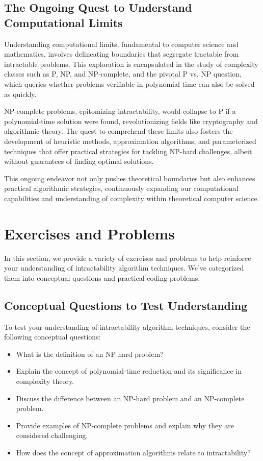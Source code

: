 \subsection{The Ongoing Quest to Understand Computational Limits}

Understanding computational limits, fundamental to computer science and mathematics, involves delineating boundaries that segregate tractable from intractable problems. This exploration is encapsulated in the study of complexity classes such as P, NP, and NP-complete, and the pivotal P vs. NP question, which queries whether problems verifiable in polynomial time can also be solved as quickly.

NP-complete problems, epitomizing intractability, would collapse to P if a polynomial-time solution were found, revolutionizing fields like cryptography and algorithmic theory. The quest to comprehend these limits also fosters the development of heuristic methods, approximation algorithms, and parameterized techniques that offer practical strategies for tackling NP-hard challenges, albeit without guarantees of finding optimal solutions.

This ongoing endeavor not only pushes theoretical boundaries but also enhances practical algorithmic strategies, continuously expanding our computational capabilities and understanding of complexity within theoretical computer science.



\section{Exercises and Problems}

In this section, we provide a variety of exercises and problems to help reinforce your understanding of intractability algorithm techniques. We've categorized them into conceptual questions and practical coding problems.

\subsection{Conceptual Questions to Test Understanding}

To test your understanding of intractability algorithm techniques, consider the following conceptual questions:

\begin{itemize}
    \item What is the definition of an NP-hard problem?
    \item Explain the concept of polynomial-time reduction and its significance in complexity theory.
    \item Discuss the difference between an NP-hard problem and an NP-complete problem.
    \item Provide examples of NP-complete problems and explain why they are considered challenging.
    \item How does the concept of approximation algorithms relate to intractability?
\end{itemize}

